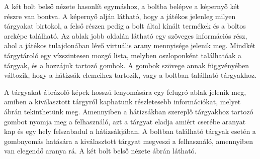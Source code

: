 A két bolt belső nézete hasonlít egymáshoz, a boltba belépve a képernyő két részre van bontva. 
A képernyő alján látható, hogy a játékos jelenleg milyen tárgyakat birtokol, a felső részen pedig a bolt által kínált termékek és a boltos arcképe található. 
Az ablak jobb oldalán látható egy szöveges információs rész, ahol a játékos tulajdonában lévő virtuális arany mennyisége jelenik meg. 
Mindkét tárgytároló egy vízszintesen mozgó lista, melyben oszloponként találhatóak a tárgyak, és a hozzájuk tartozó gombok. 
A gombok szövege annak függvényében változik, hogy a hátizsák elemeihez tartozik, vagy a boltban található tárgyakhoz. 


A tárgyakat ábrázoló képek hosszú lenyomására egy felugró ablak jelenik meg, amiben a kiválasztott tárgyról kaphatunk részletesebb információkat, melyet  ábrán tekinthetünk meg. 
Amennyiben a hátizsákban szereplő tárgyakhoz tartozó gombot nyomja meg a felhasználó, azt a tárgyat eladja amiért cserébe aranyat kap és egy hely felszabadul a hátizsákjában. 
A boltban található tárgyak esetén a gombnyomás hatására a kiválasztott tárgyat megveszi a felhasználó, amennyiben van elegendő aranya rá. 
A két bolt belső nézete  ábrán látható. 


